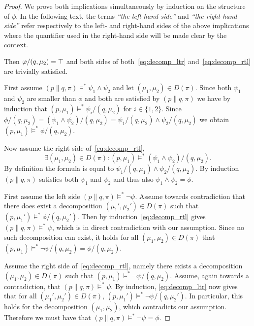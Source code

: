 \begin{proof}
    We prove both implications simultaneously by induction on the structure of $\phi$. 
    In the following text, the terms
    {\em ``the left-hand side''} and {\em ``the right-hand side''} refer respectively
    to the left- and right-hand sides of the above implications where the quantifier
    used in the right-hand side will be made clear by the context.

     Then $\varphi/(q, \mu_2) = \top$ and both sides
    of both~\eqref{eq:decomp_ltr} and~\eqref{eq:decomp_rtl} are trivially satisfied.


    \par\nobreak
    \ltr First assume $(p\parallel q, \pi)
    \vDash^* \psi_1 \land \psi_2$
    and let $(\mu_1,\mu_2)\in D(\pi)$.
    Since both $\psi_1$ and $\psi_2$ are smaller than $\phi$ and both are satisfied by
    $(p\parallel q, \pi)$ we have by induction that $(p,\mu_1) \vDash^* \psi_i/(q, \mu_2)$
    for $i\in\{1,2\}$. Since $\phi/(q,\mu_2) = (\psi_1 \land \psi_2)/(q,\mu_2) =
    \psi_1 / (q, \mu_2) \land \psi_2 / (q,\mu_2)$ we obtain $(p,\mu_1) \vDash^*
    \phi/(q,\mu_2)$.

    \rtl Now assume the right side of~\eqref{eq:decomp_rtl}, 
    \[
        \exists (\mu_1,\mu_2)\in D(\pi) : (p,\mu_1)
        \vDash^* (\psi_1 \land \psi_2)/(q, \mu_2).
    \] 
    By definition the formula is equal
    to $\psi_1/(q,\mu_1) \land \psi_2/(q,\mu_2)$. By induction \mbox{$(p\parallel q, \pi)$}
    satisfies both $\psi_1$ and $\psi_2$ and thus also $\psi_1 \land \psi_2 = \phi$.


    \par\nobreak
    \ltr First assume the left side $(p\parallel q, \pi) \vDash^* \neg\psi$.
    Assume towards
    contradiction that there does exist a decomposition $(\mu_1',\mu_2')\in D(\pi)$
    such that $(p, \mu_1') \vDash^* \phi/(q, \mu_2')$. 
    Then by induction~\eqref{eq:decomp_rtl} gives $(p\parallel q, \pi) \vDash^* \psi$,
    which is in direct contradiction with our assumption. Since no such decomposition
    can exist, it holds for all $(\mu_1,\mu_2)\in D(\pi)$ that
    $(p,\mu_1) \vDash^* \neg\psi/(q,\mu_2) = \phi/(q,\mu_2)$.

    \rtl Assume the right side of~\eqref{eq:decomp_rtl}, namely there exists a
    decomposition $(\mu_1,\mu_2)\in D(\pi)$ such that $(p,\mu_1)\vDash^* \neg\psi/(q,\mu_2)$.
    Assume, again towards a contradiction, that $(p\parallel q,\pi)\vDash^*\psi$.
    By induction, \eqref{eq:decomp_ltr} now gives that for all $(\mu_1',\mu_2')\in D(\pi)$,
    $(p,\mu_1')\vDash^* \neg\psi/(q,\mu_2')$. In particular, this holds for the
    decomposition $(\mu_1,\mu_2)$, which contradicts our assumption. Therefore
    we must have that $(p\parallel q,\pi) \vDash^* \neg\psi = \phi$.



\end{proof}
